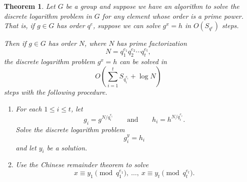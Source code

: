 \documentclass[12pt]{article}
\theoremstyle{plain}
\newtheorem{theorem}{Theorem}[section]
\theoremstyle{definition}
\theoremstyle{remark}
\begin{document}
\begin{theorem}
    Let $G$ be a group and suppose we have an algorithm to solve the discrete logarithm problem in $G$ for any element whose order is a prime power.
    That is, if $g\in G$ has order $q^e$, suppose we can solve $g^x = h$ in $O(S_{q^e})$ steps.

    Then if $g\in G$ has order $N$, where $N$ has prime factorization
    \[
        N = q_1^{e_1}q_2^{e_2}\cdots q_t^{e_t},
    \]
    the discrete logarithm problem $g^x = h$ can be solved in
    \[
        O\left(\sum_{i=1}^tS_{q_i^{e_i}} + \log N\right)
    \]
    steps with the following procedure.
    \begin{enumerate}
        \item For each $1\leq i \leq t$, let
        \[
            g_i = g^{N/q_i^{e_i}}\qquad\text{and}\qquad h_i = h^{N/q_i^{e_i}}.
        \]
        Solve the discrete logarithm problem
        \[
            g_i^y = h_i
        \]
        and let $y_i$ be a solution.

        \item Use the Chinese remainder theorem to solve
        \begin{equation}\label{simul}
            x \equiv y_1\pmod{q_1^{e_1}},\ \ldots,\ x \equiv y_t\pmod{q_t^{e_t}}.
        \end{equation}
    \end{enumerate}
\end{theorem}
\end{document}
